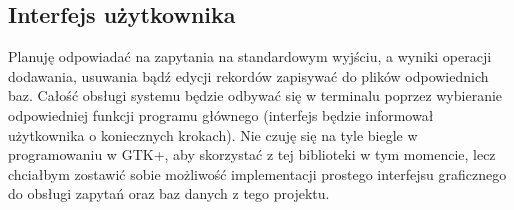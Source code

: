 \documentclass[a4paper]{article}
\begin{document}
\subsection{Interfejs użytkownika}

Planuję odpowiadać na zapytania na standardowym wyjściu, a wyniki operacji dodawania, usuwania bądź edycji rekordów zapisywać do plików odpowiednich baz.
Całość obsługi systemu będzie odbywać się w terminalu poprzez wybieranie odpowiedniej funkcji programu głównego (interfejs będzie informował użytkownika o koniecznych krokach).
Nie czuję się na tyle biegle w programowaniu w GTK+, aby skorzystać z tej biblioteki w tym momencie, lecz chciałbym zostawić sobie możliwość implementacji prostego interfejsu graficznego do obsługi zapytań oraz baz danych z tego projektu.
\end{document}
